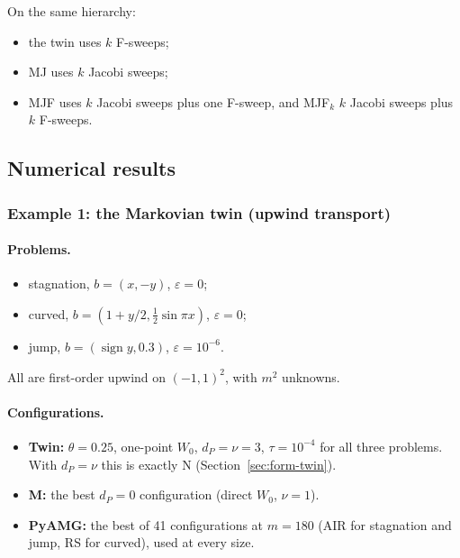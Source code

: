 On the same hierarchy:
\begin{itemize}
  \item the twin uses $k$ F-sweeps;
  \item MJ uses $k$ Jacobi sweeps;
  \item MJF uses $k$ Jacobi sweeps plus one F-sweep, and MJF$_k$ $k$ Jacobi sweeps plus $k$ F-sweeps.
\end{itemize}

\subsection{Numerical results}\label{sec:num-results}

\subsubsection{Example 1: the Markovian twin (upwind transport)}\label{sec:num-twin}

\paragraph{Problems.}
\begin{itemize}
  \item stagnation, $b=(x,-y)$, $\varepsilon=0$;
  \item curved, $b=(1+y/2,\tfrac12\sin\pi x)$, $\varepsilon=0$;
  \item jump, $b=(\operatorname{sign}y,0.3)$, $\varepsilon=10^{-6}$.
\end{itemize}
All are first-order upwind on $(-1,1)^2$, with $m^2$ unknowns.

\paragraph{Configurations.}
\begin{itemize}
  \item \textbf{Twin:} $\theta=0.25$, one-point $W_0$, $d_P=\nu=3$, $\tau=10^{-4}$ for all three problems. With
    $d_P=\nu$ this is exactly N (Section~\ref{sec:form-twin}).
  \item \textbf{M:} the best $d_P=0$ configuration (direct $W_0$, $\nu=1$).
  \item \textbf{PyAMG:} the best of 41 configurations at $m=180$ (AIR for stagnation and jump, RS for curved), used
    at every size.
\end{itemize}

